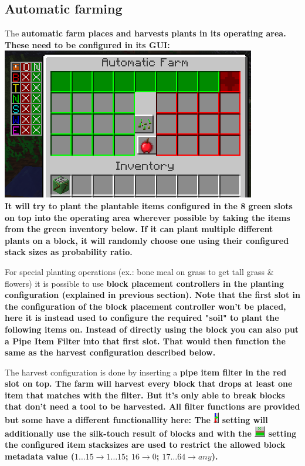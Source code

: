 \documentclass[11pt]{article} %
\begin{document}
\subsection{Automatic farming}
The \bf automatic farm \rm places and harvests plants in its operating area. These need to be configured in its GUI:\\
\includegraphics[width = \textwidth]{farm} \\
It will try to plant the plantable items configured in the 8 green slots on top into the operating area wherever possible by taking the items from the green inventory below. If it can plant multiple different plants on a block, it will randomly choose one using their configured stack sizes as probability ratio. 

For special planting operations (ex.: bone meal on grass to get tall grass \& flowers) it is possible to use \bf block placement controllers \rm in the planting configuration (explained in previous section). Note that the first slot in the configuration of the block placement controller won't be placed, here it is instead used to configure the required "soil" to plant the following items on. Instead of directly using the block you can also put a \bf Pipe Item Filter \rm into that first slot. That would then function the same as the harvest configuration described below. 

The harvest configuration is done by inserting a \bf pipe item filter \rm in the red slot on top. The farm will harvest every block that drops at least one item that matches with the filter. But it's only able to break blocks that don't need a tool to be harvested. All filter functions are provided but some have a different functionallity here: The \includegraphics[align = c]{sendFurtherN} setting will additionally use the silk-touch result of blocks and with the \includegraphics[align = c]{itemLimitY} setting the configured item stacksizes are used to restrict the allowed block metadata value ($1 \dots 15 \rightarrow 1 \dots 15$; $16 \rightarrow 0$; $17 \dots 64 \rightarrow any$).
\end{document}
